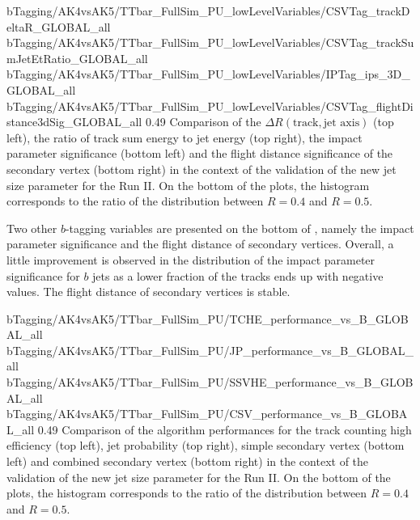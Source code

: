                       {bTagging/AK4vsAK5/TTbar_FullSim_PU_lowLevelVariables/CSVTag_trackDeltaR_GLOBAL_all}
                      {bTagging/AK4vsAK5/TTbar_FullSim_PU_lowLevelVariables/CSVTag_trackSumJetEtRatio_GLOBAL_all}
                      {bTagging/AK4vsAK5/TTbar_FullSim_PU_lowLevelVariables/IPTag_ips_3D_GLOBAL_all}
                      {bTagging/AK4vsAK5/TTbar_FullSim_PU_lowLevelVariables/CSVTag_flightDistance3dSig_GLOBAL_all}
                      {0.49}
                      {Comparison of the $\Delta R(\text{track},\text{jet axis})$ (top left),
                      the ratio of track sum energy to jet energy (top right), the impact parameter
                      significance (bottom left) and the flight distance significance of the
                      secondary vertex (bottom right) in the context of the validation
                      of the new jet size parameter for the Run II. On the bottom of the plots,
                      the histogram corresponds
                      to the ratio of the distribution between $R = 0.4$ and $R = 0.5$.}

    Two other $b$-tagging variables are presented on the bottom of
    , namely the
    impact parameter significance and the flight distance of secondary vertices. Overall,
    a little improvement is observed in the distribution of the impact parameter significance
    for $b$ jets as a lower fraction of the tracks ends up with negative values. The
    flight distance of secondary vertices is stable.

                      {bTagging/AK4vsAK5/TTbar_FullSim_PU/TCHE_performance_vs_B_GLOBAL_all}
                      {bTagging/AK4vsAK5/TTbar_FullSim_PU/JP_performance_vs_B_GLOBAL_all}
                      {bTagging/AK4vsAK5/TTbar_FullSim_PU/SSVHE_performance_vs_B_GLOBAL_all}
                      {bTagging/AK4vsAK5/TTbar_FullSim_PU/CSV_performance_vs_B_GLOBAL_all}
                      {0.49}
                      {Comparison of the algorithm performances for the track counting high
                      efficiency (top left), jet probability (top right), simple
                      secondary vertex (bottom left) and combined secondary vertex
                      (bottom right) in the context of the validation of the new jet size
                      parameter for the Run II. On the bottom of the plots, the histogram corresponds
                      to the ratio of the distribution between $R = 0.4$ and $R = 0.5$.
                      }


